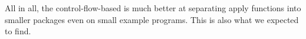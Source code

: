 All in all, the control-flow-based is much better at separating apply functions
into smaller packages even on small example programs.
This is also what we expected to find.
